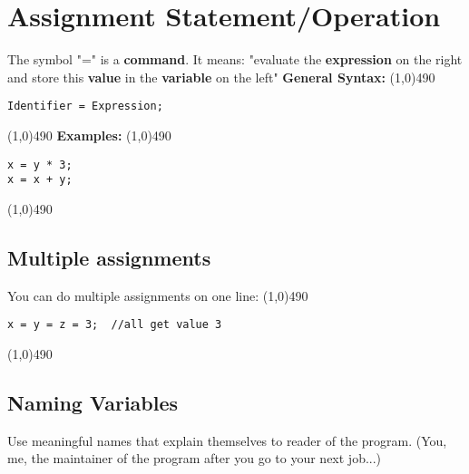 \documentclass{report}
\begin{document}
        \pagebreak \bigbreak \noindent 
        \section{\LARGE Assignment Statement/Operation}
        \bigbreak \noindent 
        The symbol "=" is a \textbf{command}. It means: "evaluate the \textbf{expression} on the right and store this \textbf{value} in the \textbf{variable} on the left"
        \bigbreak \noindent 
        \textbf{General Syntax:}
        \bigbreak \noindent 
        \line(1,0){490}
        \begin{verbatim}
Identifier = Expression;
        \end{verbatim}
        \line(1,0){490}
        \bigbreak \noindent 
        \textbf{Examples:}
        \bigbreak \noindent 
        \line(1,0){490}
        \begin{verbatim}
x = y * 3;
x = x + y;
        \end{verbatim}
        \line(1,0){490}
        \bigbreak \noindent 
        \bigbreak \noindent \bigbreak \noindent 
        \subsection{Multiple assignments}
        You can do multiple assignments on one line:
        \bigbreak \noindent 
        \line(1,0){490}
        \begin{verbatim}
x = y = z = 3;  //all get value 3
        \end{verbatim}
        \line(1,0){490}

        \pagebreak \bigbreak \noindent 
        \subsection{Naming Variables}
        \bigbreak \noindent 
        Use meaningful names that explain themselves to reader of the program. (You, me, the maintainer of the program after you go to your next job...)
\end{document}
